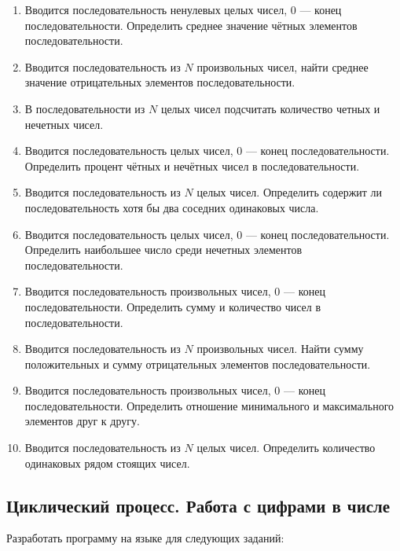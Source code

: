 \begin{enumerate}
\item Вводится последовательность ненулевых целых чисел, 0 --- конец последовательности. Определить среднее значение
чётных элементов последовательности.
\item Вводится последовательность из $N$ произвольных чисел, найти среднее значение отрицательных
элементов последовательности.
\item В последовательности из $N$ целых чисел подсчитать количество четных и нечетных чисел.
\item Вводится последовательность целых чисел, 0 --- конец последовательности. Определить процент чётных и нечётных чисел
в последовательности.
\item Вводится последовательность из $N$ целых чисел. Определить содержит ли последовательность хотя
бы два соседних одинаковых числа.
\item Вводится последовательность целых чисел, 0 --- конец последовательности. Определить наибольшее число среди нечетных
элементов последовательности.
\item Вводится последовательность произвольных чисел, 0 --- конец последовательности. Определить сумму и количество чисел
в последовательности.
\item Вводится последовательность из $N$ произвольных чисел. Найти сумму положительных и сумму
отрицательных элементов последовательности.
\item Вводится последовательность произвольных чисел, 0 --- конец последовательности. Определить отношение минимального и
максимального элементов друг к другу.
\item Вводится последовательность из $N$ целых чисел. Определить количество одинаковых рядом стоящих
чисел.
\end{enumerate}

\subsection[Циклический процесс. Работа с цифрами в числе]{Циклический процесс. Работа с цифрами в числе}
Разработать программу на языке  для следующих заданий:

